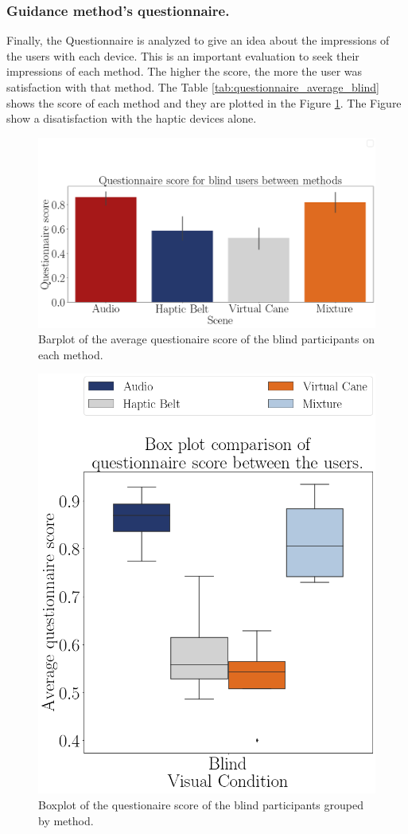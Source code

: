 \subsubsection{Guidance method's questionnaire.}
\label{subsec:results_questionnaires}

Finally, the Questionnaire is analyzed to give an idea about the impressions of the users with each device. This is an important evaluation to seek their impressions of each method. The higher the score, the more the user was satisfaction with that method. The Table \ref{tab:questionnaire_average_blind} shows the score of each method and they are plotted in the Figure \ref{fig:barplot_questionnaire_scene_blind}. The Figure show a disatisfaction with the haptic devices alone.



\begin{figure}[!htb]
    \centering
    \includegraphics[width = 0.8\linewidth]{Resultados/Questionario/Figuras/png/barplot_questionnaire_scene_blind.png}
    \caption{Barplot of the average questionaire score of the blind participants on each method.}
    \label{fig:barplot_questionnaire_scene_blind}
\end{figure}

\begin{figure}[!htb]
    \centering
    \includegraphics[width = 0.6\linewidth]{Resultados/Questionario/Figuras/png/boxplot_questionnaire_scene_blind.png}
    \caption{Boxplot of the questionaire score of the blind participants grouped by method.}
    \label{fig:boxplot_quest_blind_scene}
\end{figure}

